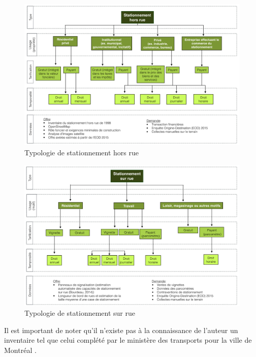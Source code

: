 \begin{figure}[ht]
    \centering
    \includegraphics[width=1.0\textwidth]{images/Typologie_Stationnement_hors_rue.png}
    \caption{Typologie de stationnement hors rue \parencite{Morency:StationnementDans:2017}}
    \label{fig:Typo_Stat_hors_rue}
  \end{figure}
\begin{figure}[ht]
    \centering
    \includegraphics[width=1.0\textwidth]{images/Typologie_Stationnement_sur_rue.png}
    \caption{Typologie de stationnement sur rue \parencite{Morency:StationnementDans:2017}}
    \label{fig:Typo_Stat_sur_rue}
\end{figure}

Il est important de noter qu'il n'existe pas à la connaissance de l'auteur un inventaire tel que celui complété par le ministère des transports pour la ville de Montréal \parencite{ConsortiumCIMA+-DanielArbouretassocies:InventaireEspaces:1998}.

